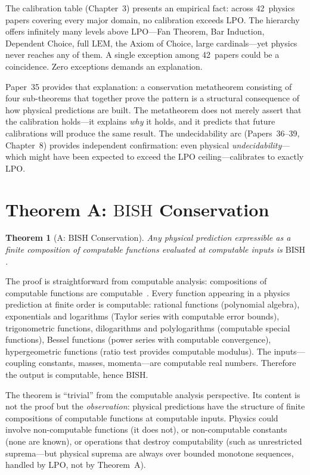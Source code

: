 \documentclass[11pt,a4paper]{report}
\theoremstyle{plain}
\newtheorem{theorem}{Theorem}[chapter]
\theoremstyle{definition}
\theoremstyle{remark}
\newcommand{\BISH}{\mathrm{BISH}}
\newcommand{\LPO}{\mathrm{LPO}}
\newcommand{\LEM}{\mathrm{LEM}}
\begin{document}
The calibration table (Chapter~3) presents an empirical fact: across 42~physics papers covering every major domain, no calibration exceeds $\LPO$. The hierarchy offers infinitely many levels above $\LPO$---Fan Theorem, Bar Induction, Dependent Choice, full $\LEM$, the Axiom of Choice, large cardinals---yet physics never reaches any of them. A single exception among 42~papers could be a coincidence. Zero exceptions demands an explanation.

Paper~35 provides that explanation: a conservation metatheorem consisting of four sub-theorems that together prove the pattern is a structural consequence of how physical predictions are built. The metatheorem does not merely assert that the calibration holds---it explains \emph{why} it holds, and it predicts that future calibrations will produce the same result. The undecidability arc (Papers~36--39, Chapter~8) provides independent confirmation: even physical \emph{undecidability}---which might have been expected to exceed the $\LPO$ ceiling---calibrates to exactly $\LPO$.

\section{Theorem A: $\BISH$ Conservation}

\begin{theorem}[A: $\BISH$ Conservation]
Any physical prediction expressible as a finite composition of computable functions evaluated at computable inputs is $\BISH$.
\end{theorem}

The proof is straightforward from computable analysis: compositions of computable functions are computable~\cite{Weihrauch2000}. Every function appearing in a physics prediction at finite order is computable: rational functions (polynomial algebra), exponentials and logarithms (Taylor series with computable error bounds), trigonometric functions, dilogarithms and polylogarithms (computable special functions), Bessel functions (power series with computable convergence), hypergeometric functions (ratio test provides computable modulus). The inputs---coupling constants, masses, momenta---are computable real numbers. Therefore the output is computable, hence $\BISH$.

The theorem is ``trivial'' from the computable analysis perspective. Its content is not the proof but the \emph{observation}: physical predictions have the structure of finite compositions of computable functions at computable inputs. Physics could involve non-computable functions (it does not), or non-computable constants (none are known), or operations that destroy computability (such as unrestricted suprema---but physical suprema are always over bounded monotone sequences, handled by $\LPO$, not by Theorem~A).
\end{document}
